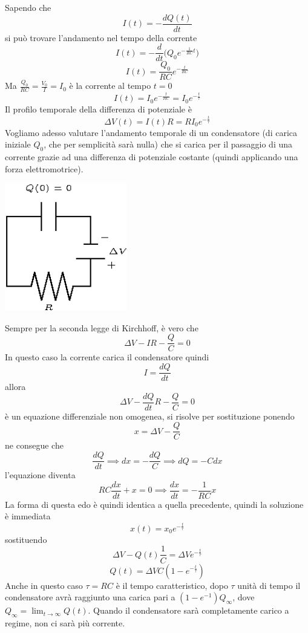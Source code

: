 \documentclass[10pt, letterpaper]{report}
\begin{document}
Sapendo che $$ I(t)=-\frac{dQ(t)}{dt}$$
si può trovare l'andamento nel tempo della corrente 
$$ I(t)=-\frac{d}{dt}\Big( Q_0e^{-\frac{1}{RC}t} \Big)$$
$$ 
I(t)=\frac{Q_0}{RC}e^{-\frac{t}{RC}}
$$
Ma $\frac{Q_0}{RC}=\frac{V_0}{I}=I_0$
è la corrente al tempo $t=0$
$$ 
I(t)=I_0e^{-\frac{t}{RC}}=I_0e^{-\frac{t}{\tau}}
$$
Il profilo temporale della differenza di potenziale è 
$$ \Delta V(t)=I(t)R=RI_0e^{-\frac{t}{\tau}}$$
Vogliamo adesso valutare l'andamento temporale di un condensatore (di carica iniziale $Q_0$, che per semplicità sarà nulla) che si carica per il passaggio di una corrente grazie ad una differenza di potenziale costante (quindi applicando una forza elettromotrice).\begin{center}
    \includegraphics[width=0.4\textwidth]{images/caricaCondensatoreTempo2.eps}
\end{center}
Sempre per la seconda legge di Kirchhoff, è vero che 
$$ \Delta V-IR-\frac{Q}{C}=0$$
In questo caso la corrente carica il condensatore quindi 
$$ I=\frac{dQ}{dt}$$
allora 
$$ \Delta V - \frac{dQ}{dt}R-\frac{Q}{C}=0$$
è un equazione differenziale non omogenea, si risolve per sostituzione ponendo 
$$ x=\Delta V-\frac{Q}{C}$$
ne consegue che 
$$ \frac{dQ}{dt}\implies dx=-\frac{dQ}{C}\implies dQ=-Cdx$$
l'equazione diventa 
$$ RC\frac{dx}{dt}+x=0\implies \frac{dx}{dt}=-\frac{1}{RC}x$$
La forma di questa edo è quindi identica a quella precedente, quindi la soluzione è immediata 
$$x(t)=x_0e^{-\frac{t}{\tau}} $$
sostituendo 
$$ \Delta V-Q(t)\frac{1}{C}=\Delta Ve^{-\frac{t}{\tau}}$$
$$ Q(t)=\Delta V C(1-e^{-\frac{t}{\tau}})$$
Anche in questo caso $\tau=RC$ è il tempo caratteristico, dopo $\tau$ unità di tempo il condensatore avrà raggiunto una carica pari a $(1-e^{-1})Q_{\infty}$, dove $Q_{\infty}=\lim_{t\rightarrow\infty}Q(t)$. Quando il condensatore sarà completamente carico a regime, non ci sarà più corrente.\begin{center}
\end{center}
\end{document}
